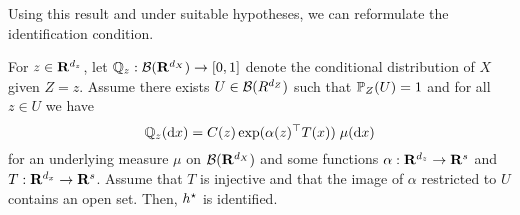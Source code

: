 Using this result and under suitable hypotheses, we can reformulate the identification condition.
\begin{thm}
    For $ z \in \mathbf{R}^{ d_{ z } } $, let $ \mathbb{Q}_{ z } : \mathcal{B} ( \mathbf{R}^{ d_{ X } } ) \to [0, 1] $ denote the conditional distribution of $ X $ given $ Z = z $.
    Assume there exists $ U \in \mathcal{B} ( R^{ d_{ Z } } ) $ such that $ \mathbb{P}_{ Z } ( U ) = 1 $ and for all $ z \in U $ we have
    \begin{equation*}
        \mathbb{Q}_{ z } ( \mathrm{d} x ) = C ( z ) \exp ( \alpha ( z )^{ \top } T ( x ) ) \; \mu ( \mathrm{d} x )
    \end{equation*}
    for an underlying measure $ \mu $ on $ \mathcal{B} ( \mathbf{R}^{ d_{ X } } ) $ and some functions $ \alpha : \mathbf{R}^{ d_{ z } } \to \mathbf{R}^{ s } $ and $ T : \mathbf{R}^{ d_{ x } } \to \mathbf{R}^{ s } $.
    Assume that $ T $ is injective and that the image of $ \alpha $ restricted to $ U $ contains an open set.
    Then, $ h^{ \star } $ is identified.
\end{thm}
